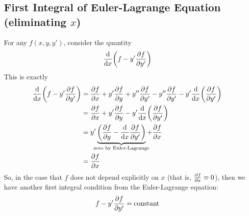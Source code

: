 \subsection{First Integral of Euler-Lagrange Equation (eliminating \(x\))}
For any \( f (x, y, y') \), consider the quantity
\[ \dv{x}\qty(f - y' \pdv{f}{y'}) \]
This is exactly
\begin{align*}
    \dv{x}\qty(f - y' \pdv{f}{y'}) &= \pdv{f}{x} + y' \pdv{f}{y} + y''\pdv{f}{y'} - y'' \pdv{f}{y'} - y' \dv{x}\qty(\pdv{f}{y'}) \\
    &= \pdv{f}{x} + y' \pdv{f}{y} - y' \dv{x}\qty(\pdv{f}{y'}) \\
    &= y' \underbrace{\qty( \pdv{f}{y} - \dv{x}\pdv{f}{y'} )}_{\mathclap{\text{zero by Euler-Lagrange}}} + \pdv{f}{x} \\
    &= \pdv{f}{x} \\
\end{align*}
So, in the case that \( f \) does not depend explicitly on \( x \) (that is, \( \pdv{f}{x} \equiv 0 \)), then we have another first integral condition from the Euler-Lagrange equation:
\[ f - y' \pdv{f}{y'} = \text{constant} \]

